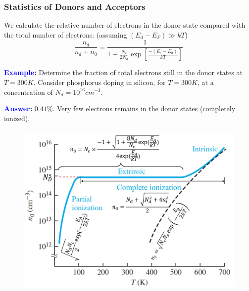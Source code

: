 \documentclass{beamer}
\begin{document}
    \begin{frame} \frametitle{Statistics of Donors and Acceptors}
        
        \par We calculate the relative number of electrons in the donor state compared with the total number of electrons: (assuming $(E_d - E_F) \gg  kT$)
        \begin{equation*}
            \frac{n_d}{n_d + n_0} = \frac{1}{1 + \frac{N_c}{2N_d} \exp\left[ \frac{-(E_c - E_d)}{kT}  \right]} 
        \end{equation*}
        \par \textbf{\textcolor{blue}{Example}:} Determine the fraction of total electrons still in the donor states at $T = 300 K$. Consider phosphorus doping in silicon, for $T = 300 K$, at a concentration of $N_d = 10^{16} cm^{-3}$.
        \par \textbf{\textcolor{blue}{Answer}:} $0.41\%$. Very few electrons remains in the donor states (completely ionized).
    \end{frame}

    \begin{frame} \frametitle{}
        \begin{figure}[H]
            \centering
            \includegraphics[width=0.95\linewidth]{n0-versus-T.jpg}
            \label{fig:n0-versus-T-0.jpg}
        \end{figure}
    \end{frame}
\end{document}
